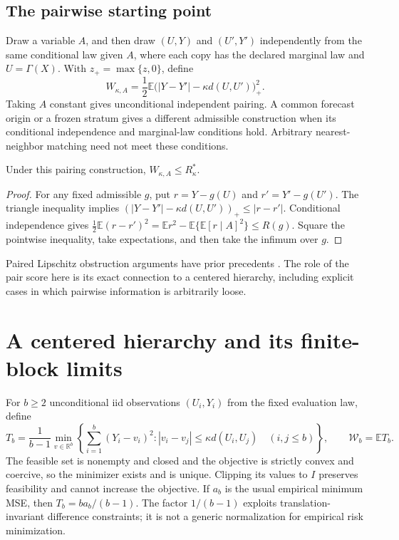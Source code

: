 \subsection{The pairwise starting point}

Draw a variable $A$, and then draw $(U,Y)$ and $(U',Y')$ independently from
the same conditional law given $A$, where each copy has the declared
marginal law and $U=\Gamma(X)$. With $z_+=\max\{z,0\}$, define
\begin{equation}
 W_{\kappa,A}
 =\frac12\mathbb E\bigl(|Y-Y'|-\kappa d(U,U')\bigr)_+^2.
 \label{eq:pair}
\end{equation}
Taking $A$ constant gives unconditional independent pairing. A common
forecast origin or a frozen stratum gives a different admissible
construction when its conditional independence and marginal-law conditions
hold. Arbitrary nearest-neighbor matching need not meet these conditions.

\begin{proposition}
\label{prop:pair}
Under this pairing construction, $W_{\kappa,A}\leq R^*_\kappa$.
\end{proposition}

\begin{proof}
For any fixed admissible $g$, put $r=Y-g(U)$ and $r'=Y'-g(U')$.
The triangle inequality implies
$(|Y-Y'|-\kappa d(U,U'))_+\leq|r-r'|$.
Conditional independence gives
$\frac12\mathbb E(r-r')^2
=\mathbb E r^2-\mathbb E\{\mathbb E[r\mid A]^2\}\leq R(g)$.
Square the pointwise inequality, take expectations, and then take the
infimum over $g$.
\end{proof}

Paired Lipschitz obstruction arguments have prior precedents
\citep{akash2021inverse}. The role of the pair score here is its exact
connection to a centered hierarchy, including explicit cases in which
pairwise information is arbitrarily loose.

\section{A centered hierarchy and its finite-block limits}
\label{sec:hierarchy}

For $b\geq2$ unconditional iid observations $(U_i,Y_i)$ from the fixed
evaluation law, define
\begin{equation}
 T_b=\frac1{b-1}\min_{v\in\mathbb R^b}
 \left\{\sum_{i=1}^b(Y_i-v_i)^2:
    |v_i-v_j|\leq\kappa d(U_i,U_j)\quad(i,j\leq b)\right\},
 \qquad \mathcal W_b=\mathbb E T_b.
 \label{eq:block}
\end{equation}
The feasible set is nonempty and closed and the objective is strictly
convex and coercive, so the minimizer exists and is unique. Clipping its
values to $I$ preserves feasibility and cannot increase the objective.
If $a_b$ is the usual empirical minimum MSE, then
$T_b=b a_b/(b-1)$. The factor $1/(b-1)$ exploits translation-invariant
difference constraints; it is not a generic normalization for empirical
risk minimization.

